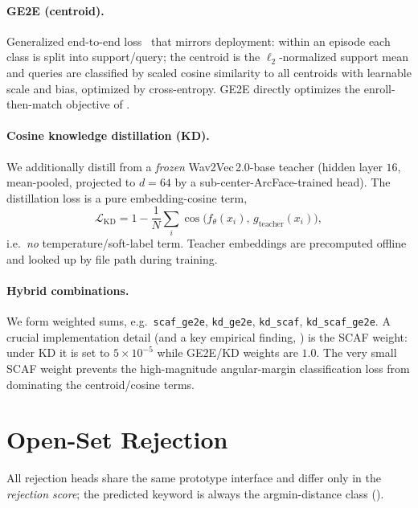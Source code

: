 \documentclass[10pt,twocolumn]{article}
\newcommand{\code}[1]{\texttt{\small #1}}
\begin{document}
\paragraph{GE2E (centroid).}
Generalized end-to-end loss~\cite{wan2018ge2e} that mirrors deployment: within
an episode each class is split into support/query; the centroid is the
$\ell_2$-normalized support mean and queries are classified by scaled cosine
similarity to all centroids with learnable scale and bias, optimized by
cross-entropy. GE2E directly optimizes the enroll-then-match objective of
.

\paragraph{Cosine knowledge distillation (KD).}
We additionally distill from a \emph{frozen} Wav2Vec\,2.0-base teacher (hidden
layer $16$, mean-pooled, projected to $d{=}64$ by a sub-center-ArcFace-trained
head). The distillation loss is a pure embedding-cosine term,
\begin{equation}
\mathcal{L}_{\text{KD}}=1-\frac{1}{N}\sum_i
\cos\!\big(f_\theta(x_i),\, g_{\text{teacher}}(x_i)\big),
\label{eq:kd}
\end{equation}
i.e.\ \emph{no} temperature/soft-label term. Teacher embeddings are precomputed
offline and looked up by file path during training.

\paragraph{Hybrid combinations.}
We form weighted sums, e.g.\ \code{scaf\_ge2e}, \code{kd\_ge2e},
\code{kd\_scaf}, \code{kd\_scaf\_ge2e}. A crucial implementation detail (and a
key empirical finding, ) is the SCAF weight: under KD it is set
to $5{\times}10^{-5}$ while GE2E/KD weights are $1.0$. The very small SCAF weight
prevents the high-magnitude angular-margin classification loss from dominating
the centroid/cosine terms.

\section{Open-Set Rejection}\label{sec:openset}

All rejection heads share the same prototype interface and differ only in the
\emph{rejection score}; the predicted keyword is always the argmin-distance class
().
\end{document}
